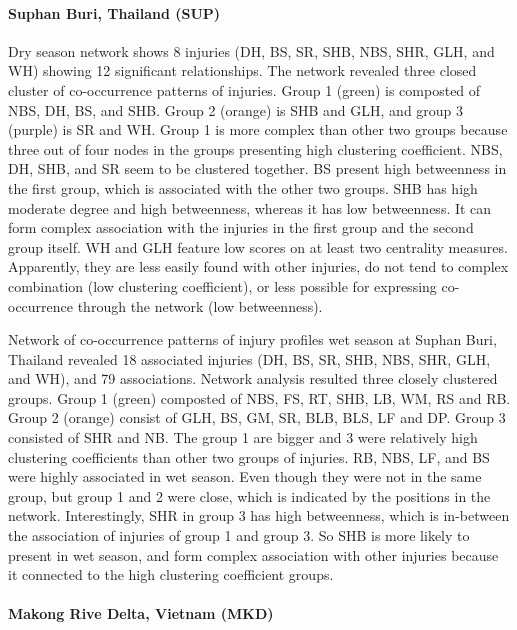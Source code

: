 \paragraph{Suphan Buri, Thailand (SUP)}

Dry season network shows 8 injuries (DH, BS, SR, SHB, NBS, SHR, GLH, and WH) showing 12 significant relationships. The network revealed three closed cluster of co-occurrence patterns of injuries. Group 1 (green) is composted of NBS, DH, BS, and SHB. Group 2 (orange) is SHB and GLH, and group 3 (purple) is SR and WH. Group 1 is more complex than other two groups because three out of four nodes in the groups presenting high clustering coefficient. NBS, DH, SHB, and SR seem to be clustered together. BS present high betweenness in the first group, which is associated with the other two groups. SHB has high moderate degree and high betweenness, whereas it has low betweenness.  It can form complex association with the injuries in the first group and the second group itself.  WH and GLH feature low scores on at least two centrality measures. Apparently, they are less easily found with other injuries, do not tend to complex combination (low clustering coefficient), or less possible for expressing co-occurrence through the network (low betweenness). 

Network of co-occurrence patterns of injury profiles wet season at Suphan Buri, Thailand revealed 18 associated injuries (DH, BS, SR, SHB, NBS, SHR, GLH, and WH), and 79 associations. Network analysis resulted three closely clustered groups. Group 1 (green) composted of NBS, FS, RT, SHB, LB, WM, RS and RB. Group 2 (orange) consist of GLH, BS, GM, SR, BLB, BLS, LF and DP. Group 3 consisted of SHR and NB. The group 1 are bigger and 3 were relatively high clustering coefficients than other two groups of injuries. RB, NBS, LF, and BS were highly associated in wet season. Even though they were not in the same group, but group 1 and 2 were close, which is indicated by the positions in the network. Interestingly, SHR in group 3 has high betweenness, which is in-between the association of injuries of group 1 and group 3. So SHB is more likely to present in wet season, and form complex association with other injuries because it connected to the high clustering coefficient groups.

\newpage

\paragraph{Makong Rive Delta, Vietnam (MKD)}

